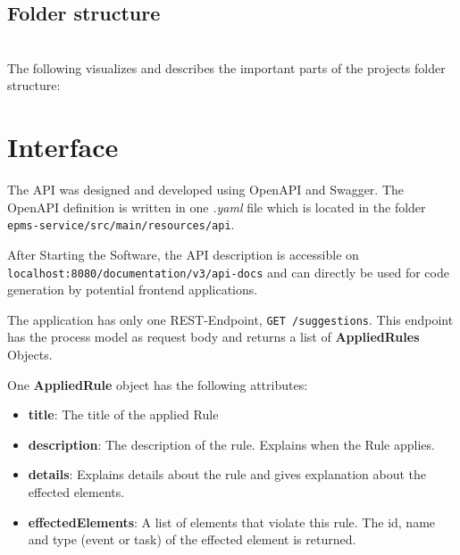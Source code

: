 \subsection{Folder structure}~\\
The following visualizes and describes the important parts of the projects folder structure:

\section{Interface}
The API was designed and developed using OpenAPI and Swagger\cite{swagger}. The OpenAPI definition is written in one \textit{.yaml} file which is located in the folder\\ \verb|epms-service/src/main/resources/api|.

After Starting the Software, the API description is accessible on \\ \verb|localhost:8080/documentation/v3/api-docs| and can directly be used for code generation by potential frontend applications. 

The application has only one REST-Endpoint, \verb|GET /suggestions|. This endpoint has the process model as request body and returns a list of \textbf{AppliedRules} Objects. 

One \textbf{AppliedRule} object has the following attributes:
\begin{itemize}
	\item \textbf{title}: The title of the applied Rule
	\item \textbf{description}: The description of the rule. Explains when the Rule applies.
	\item \textbf{details}: Explains details about the rule and gives explanation about the effected elements.
	\item \textbf{effectedElements}: A list of elements that violate this rule. The id, name and type (event or task) of the effected element is returned.
\end{itemize} 
